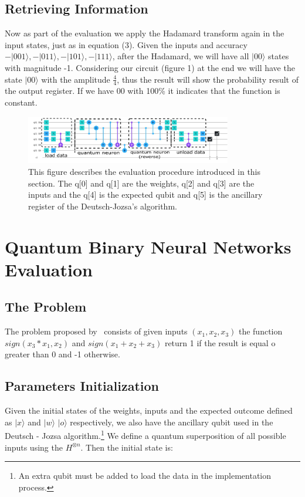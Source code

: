 \documentclass[conference]{IEEEtran}
\begin{document}
\subsection{Retrieving Information}\label{subsec:neuron-evaluation}

Now as part of the evaluation we apply the Hadamard transform again in the input states, just as in equation (3).
Given the inputs and accuracy \(-|001\rangle, -|011\rangle, - |101\rangle, -|111\rangle\), after the Hadamard, we will have
all \(|00\rangle\) states with magnitude -1.
Considering our circuit (figure 1) at the end we will have the state \(|00\rangle\) with the amplitude \(\frac{4}{4}\),
thus the result will show the probability result of the output register.
If we have 00 with 100\% it indicates that the function is constant.

\begin{figure}[h!]
    \centering
    \includegraphics[width=9cm, scale=0.5]{images/circuit.pdf}
    \caption{This figure describes the evaluation procedure introduced in this section.
    The q[0] and q[1] are the weights, q[2] and q[3] are the inputs and the q[4] is the expected qubit
    and q[5] is the ancillary register of the Deutsch-Jozsa's algorithm.}\label{Fig:MV}
\end{figure}

\section{Quantum Binary Neural Networks Evaluation}\label{sec:quantum-binary-neural-networks-evaluation}

\subsection*{The Problem}\label{subsec:the-problem2}
 The problem proposed by~\cite{fawaz2019training} consists of given inputs \((x_1, x_2, x_3)\) the function
  \(sign(x_3*x_1, x_2)\) and \(sign(x_1 + x_2 + x_3)\) return 1 if the result is equal o greater than 0 and -1 otherwise.

 \subsection{Parameters Initialization}\label{subsec:initializaton}
   Given the initial states of the weights, inputs and the expected outcome defined as $|x\rangle$ and $|w\rangle$
 $|o\rangle$ respectively, we also have the ancillary qubit used in the Deutsch - Jozsa algorithm.\footnote[1]{
  An extra qubit must be added to load the data in the implementation process.}
 We define a quantum superposition of all possible inputs using the $H^ {\otimes n}$.
 Then the initial state is:
\end{document}
